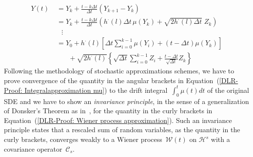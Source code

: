 \begin{align}
    Y(t) & \; = Y_k + \frac{t - k \Delta t}{\Delta t} (Y_{k+1} - Y_k) \nonumber  \\
    & \; = Y_k + \frac{t - k \Delta t}{\Delta t} (h^{\cdot}(l) \Delta t \, \mu(Y_k) +\sqrt{2h^{\cdot}(l) \Delta t } \; Z_k ) \nonumber \\
    & \quad \vdots \nonumber \\
    & \; = Y_0 + h^{\cdot}(l) \left[ \Delta t \sum_{i=0}^{k-1} \mu(Y_i) + (t - \Delta t) \mu(Y_k) \right] \label{DLR-Proof: Integralapproximation mu} \\ 
    & \qquad + \sqrt{2 h^{\cdot}(l)} \left\{ \sqrt{ \Delta t} \sum_{i=0}^{k-1} Z_i +  \frac{t - \Delta t}{\sqrt{\Delta t}} Z_k \right\} \label{DLR-Proof: Wiener process approximation}
\end{align}
Following the methodology of stochastic approximations schemes, we have to prove convergence of the quantity in the angular brackets in Equation~(\ref{DLR-Proof: Integralapproximation mu}) to the drift integral~$\int_0^t \mu (t) dt$ of the original SDE and we have to show an \textit{invariance principle}, in the sense of a generalization of Donsker's Theorem as in~\autocite{Revuz2005}, for the quantity in the curly brackets in Equation~(\ref{DLR-Proof: Wiener process approximation}). Such an invariance principle states  that a rescaled sum of random variables, as the quantity in the curly brackets, converges weakly to a Wiener process~$\mathcal{W}(t)$ on $\mathcal{H}^s$ with a covariance operator~$\mathcal{C}_s$. 
\newline


